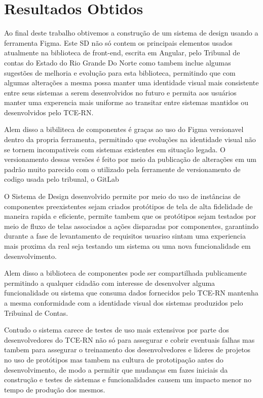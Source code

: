 \chapter[Capítulo 4]{Resultados Obtidos}
\label{ch:cap4}

  Ao final deste trabalho obtivemos a construção de um sistema de design usando a ferramenta Figma. Este SD não só contem os principais elementos usados atualmente na biblioteca de front-end, escrita em Angular, pelo Tribunal de contas do Estado do Rio Grande Do Norte como tambem inclue algumas sugestões de melhoria e evolução para esta biblioteca, permitindo que com algumas alterações a mesma possa manter uma identidade visual mais consistente entre seus sistemas a serem desenvolvidos no futuro e permita aos usuários manter uma experencia mais uniforme ao transitar entre sistemas mantidos ou desenvolvidos pelo TCE-RN.
  
  Alem disso a bibiliteca de componentes é graças ao uso do Figma versionavel dentro da propria ferramenta, permitindo que evoluções na identidade visual não se tornem incompativeis com sistemas existentes em situação legada. O versionamento dessas versões é feito por meio da publicação de alterações em um padrão muito parecido com o utilizado pela ferramente de versionamento de codigo usada pelo tribunal, o GitLab

  O Sistema de Design desenvolvido permite por meio do uso de instâncias de componentes preexistentes sejam criados protótipos de tela de alta fidelidade de maneira rapida e eficiente, permite tambem que os protótipos sejam testados por meio de fluxo de telas associados a ações disparadas por componentes, garantindo durante a fase de levantamento de requisitos usuariso sintam uma experiencia mais proxima da real seja testando um sistema ou uma nova funcionalidade em desenvolvimento.

  Alem disso a biblioteca de componentes pode ser compartilhada publicamente permitindo a qualquer cidadão com interesse de desenvolver alguma funcionalidade ou sistema que consuma dados fornecidos pelo TCE-RN mantenha a mesma conformidade com a identidade visual dos sistemas produzidos pelo Tribuinal de Contas.

  Contudo o sistema carece de testes de uso mais extensivos por parte dos desenvolvedores do TCE-RN não só para assegurar e cobrir eventuais falhas mas tambem para assegurar o treinamento dos desenvolvedores e lideres de projetos no uso de protótipos mas tambem na cultura de prototipação antes do desenvolvimento, de modo a permitir que mudanças em fazes iniciais da construção e testes de sistemas e funcionalidades causem um impacto menor no tempo de produção dos mesmos.

